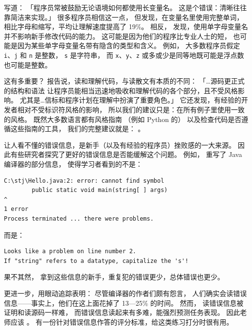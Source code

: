 \cite{Kern1999}写道：
「程序员常被鼓励无论语境如何都使用长变量名。
这是个错误：清晰往往靠简洁来实现。」
很多程序员相信这一点，
但\cite{Hofm2017}发现，在变量名里使用完整单词，
相比字母和缩写，平均让理解速度提高了 19\%。
相反，
\cite{Beni2017}发现，使用单字母变量名并不影响新手修改代码的能力。
这可能是因为他们的程序比专业人士的短，
也可能是因为某些单字母变量名带有隐含的类型和含义。
例如，
大多数程序员假定 \texttt{i}、\texttt{j} 和 \texttt{n} 是整数，
\texttt{s} 是字符串，
而 \texttt{x}、\texttt{y}、\texttt{z} 或多或少是同等地既可能是浮点数也可能是整数。

这有多重要？
\cite{Bink2012}报告说，读和理解代码，与读散文有本质的不同：
「{\ldots}源码更正式的结构和语法
让程序员能相当迅速地吸收和理解代码的各个部分，且不受风格影响。
尤其是{\ldots}信标和程序计划在理解中扮演了重要角色。」
它还发现，有经验的开发者相对不受标识符风格的影响，
所以我们的建议只是：在所有例子里使用一致的风格。
既然大多数语言都有风格指南
（例如 Python 的）
以及检查代码是否遵循这些指南的工具，
我们的完整建议就是：
。


让人看不懂的错误信息，是新手（以及有经验的程序员）挫败感的一大来源。
因此有些研究者探究了更好的错误信息是否能缓解这个问题。
例如，
\cite{Beck2016}重写了 Java 编译器的部分信息，
使得学习者看到的不是：

\begin{verbatim}
C:\stj\Hello.java:2: error: cannot find symbol
        public static void main(string[ ] args)
^
1 error
Process terminated ... there were problems.
\end{verbatim}

\noindent
而是：

\begin{verbatim}
Looks like a problem on line number 2.
If "string" refers to a datatype, capitalize the 's'!
\end{verbatim}

\noindent
果不其然，
拿到这些信息的新手，重复犯的错误更少，总体错误也更少。

\cite{Bari2017}更进一步，用眼动追踪表明：
尽管编译器的作者们颇有怨言，
人们确实会读错误信息——事实上，他们在这上面花掉了 13—25\% 的时间。
然而，
读错误信息被证明和读源码一样难，
而错误信息读起来有多难，能强烈预测任务表现。
因此老师应该
。
\cite{Marc2011}有一份针对错误信息作答的评分标准，给这类练习打分时很有用。


